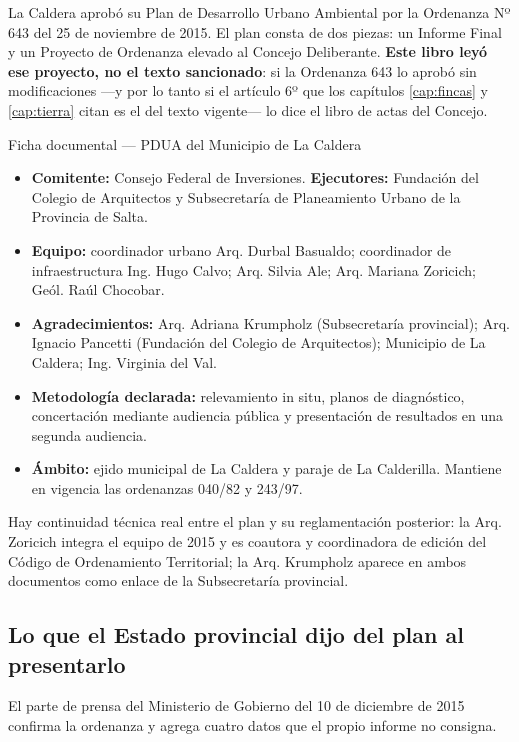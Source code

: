 La Caldera aprobó su Plan de Desarrollo Urbano Ambiental por la Ordenanza Nº 643 del 25 de noviembre de 2015. El plan consta de dos piezas: un Informe Final y un Proyecto de Ordenanza elevado al Concejo Deliberante. \textbf{Este libro leyó ese proyecto, no el texto sancionado}: si la Ordenanza 643 lo aprobó sin modificaciones ---y por lo tanto si el artículo 6º que los capítulos \ref{cap:fincas} y \ref{cap:tierra} citan es el del texto vigente--- lo dice el libro de actas del Concejo. 

\begin{ficha}{Ficha documental --- PDUA del Municipio de La Caldera}
\begin{itemize}[leftmargin=*,nosep]
\item \textbf{Comitente:} Consejo Federal de Inversiones. \textbf{Ejecutores:} Fundación del Colegio de Arquitectos y Subsecretaría de Planeamiento Urbano de la Provincia de Salta.
\item \textbf{Equipo:} coordinador urbano Arq. Durbal Basualdo; coordinador de infraestructura Ing. Hugo Calvo; Arq. Silvia Ale; Arq. Mariana Zoricich; Geól. Raúl Chocobar.
\item \textbf{Agradecimientos:} Arq. Adriana Krumpholz (Subsecretaría provincial); Arq. Ignacio Pancetti (Fundación del Colegio de Arquitectos); Municipio de La Caldera; Ing. Virginia del Val.
\item \textbf{Metodología declarada:} relevamiento in situ, planos de diagnóstico, concertación mediante audiencia pública y presentación de resultados en una segunda audiencia.
\item \textbf{Ámbito:} ejido municipal de La Caldera y paraje de La Calderilla. Mantiene en vigencia las ordenanzas 040/82 y 243/97.
\end{itemize}
\end{ficha}

Hay continuidad técnica real entre el plan y su reglamentación posterior: la Arq. Zoricich integra el equipo de 2015 y es coautora y coordinadora de edición del Código de Ordenamiento Territorial; la Arq. Krumpholz aparece en ambos documentos como enlace de la Subsecretaría provincial.

\subsection*{Lo que el Estado provincial dijo del plan al presentarlo}

El parte de prensa del Ministerio de Gobierno del 10 de diciembre de 2015 confirma la ordenanza y agrega cuatro datos que el propio informe no consigna.

